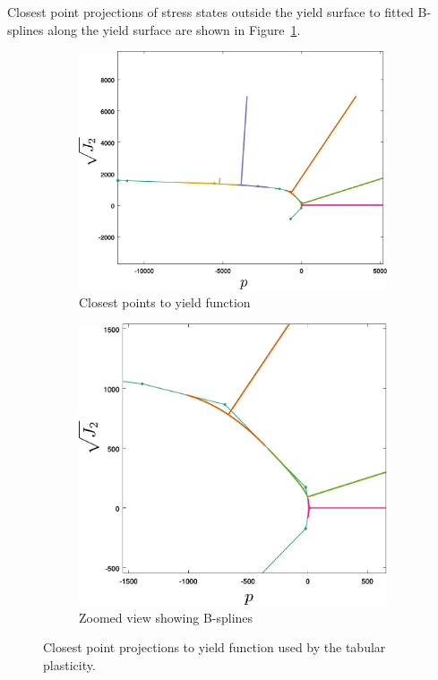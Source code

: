 Closest point projections of stress states outside the yield surface to fitted B-splines 
along the yield surface are shown in Figure~\ref{fig:tabular_yield_closest}.
\begin{figure}[htbp!]
  \begin{subfigure}[t]{0.5\textwidth}
    \centering
    \includegraphics[width=\textwidth]{Figs/tabular/table_yield_closest.pdf}
    \caption{Closest points to yield function}
  \end{subfigure}
  \begin{subfigure}[t]{0.5\textwidth}
    \centering
    \includegraphics[width=\textwidth]{Figs/tabular/table_yield_closest_zoom.pdf}
    \caption{Zoomed view showing B-splines}
  \end{subfigure}
  \caption{Closest point projections to yield function used by the tabular plasticity.}
  \label{fig:tabular_yield_closest}
\end{figure}

